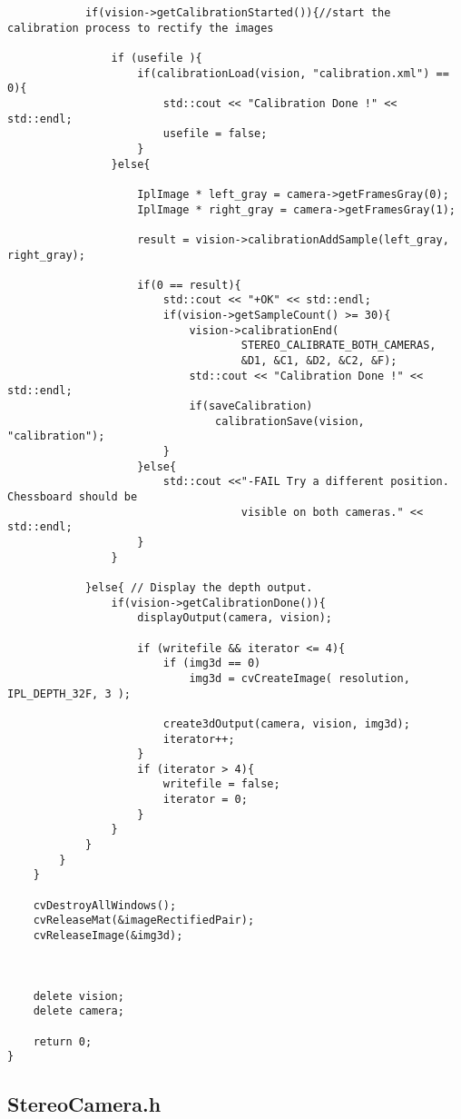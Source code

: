 \begin{lstlisting}
			if(vision->getCalibrationStarted()){//start the calibration process to rectify the images

				if (usefile ){
					if(calibrationLoad(vision, "calibration.xml") == 0){
						std::cout << "Calibration Done !" << std::endl;
						usefile = false;
					}
				}else{

					IplImage * left_gray = camera->getFramesGray(0);
					IplImage * right_gray = camera->getFramesGray(1);

					result = vision->calibrationAddSample(left_gray, right_gray);

					if(0 == result){
						std::cout << "+OK" << std::endl;
						if(vision->getSampleCount() >= 30){
							vision->calibrationEnd(
									STEREO_CALIBRATE_BOTH_CAMERAS,
									&D1, &C1, &D2, &C2, &F);
							std::cout << "Calibration Done !" << std::endl;
							if(saveCalibration)
								calibrationSave(vision, "calibration");
						}
					}else{
						std::cout <<"-FAIL Try a different position. Chessboard should be 
                                    visible on both cameras." << std::endl;
					}
				}

			}else{ // Display the depth output.
				if(vision->getCalibrationDone()){
					displayOutput(camera, vision);

					if (writefile && iterator <= 4){
						if (img3d == 0)
							img3d = cvCreateImage( resolution, IPL_DEPTH_32F, 3 );

						create3dOutput(camera, vision, img3d);
						iterator++;
					}
					if (iterator > 4){
						writefile = false;
						iterator = 0;
					}
				}
			}
		}
	}

	cvDestroyAllWindows();
	cvReleaseMat(&imageRectifiedPair);
	cvReleaseImage(&img3d);



    delete vision;
    delete camera;

    return 0;
}
\end{lstlisting}

\subsection{StereoCamera.h}

